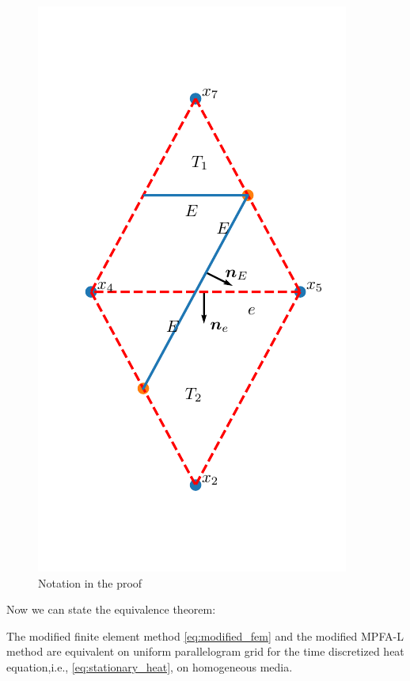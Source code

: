 \documentclass[../Main/main.tex]{subfiles}
\begin{document}
	\begin{figure}[H]
		\centering
		\includegraphics{two triangles.pdf}
		\caption{Notation in the proof}
		\label{fig:two triangles}
	\end{figure}
	Now we can state the equivalence theorem:
	\begin{theorem}
		The modified finite element method \eqref{eq:modified_fem} and the modified MPFA-L method are equivalent on uniform parallelogram grid for the time discretized heat equation,i.e., \eqref{eq:stationary_heat}, on homogeneous media. 
	\end{theorem}
\end{document}
